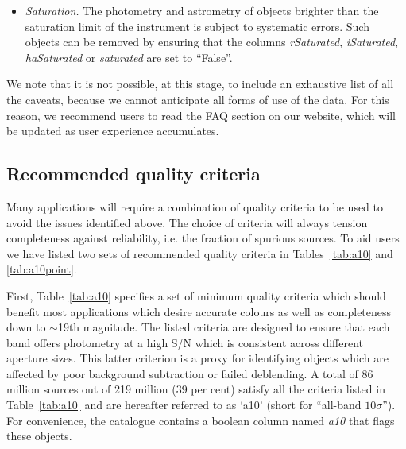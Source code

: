 \documentclass[a4paper,useAMS,usenatbib]{mn2e}
\begin{document}
{\begin{itemize}
These objects can be removed by ensuring that an
object is detected at $S/N>10$
and has photometry which is consistent across
the different aperture sizes.
Objects detected at $S/N>10$ in all bands
are flagged in the catalogue using the \emph{a10} column.
\item \emph{Saturation.}
The photometry and astrometry of objects
brighter than the saturation limit of the instrument
is subject to systematic errors.
Such objects can be removed by ensuring that the columns
\emph{rSaturated}, \emph{iSaturated}, \emph{haSaturated}
or \emph{saturated} are set to ``False''.
\end{itemize}
We note that it is not possible, at this stage,
to include an exhaustive list of all the caveats,
because we cannot anticipate all forms of use of the data.
For this reason, we recommend users to read
the FAQ section on our website,
which will be updated as user experience accumulates.


\subsection{Recommended quality criteria}
\label{sec:qualitycriteria}

Many applications will require
a combination of quality criteria
to be used
to avoid the issues identified above.
The choice of criteria will always tension 
completeness against reliability,
i.e. the fraction of spurious sources.
To aid users we have listed two sets of
recommended quality criteria 
in Tables~\ref{tab:a10} and \ref{tab:a10point}.

First, Table~\ref{tab:a10} specifies
a set of minimum quality criteria
which should benefit most applications
which desire accurate colours
as well as completeness down to $\sim$19th magnitude.
The listed criteria are designed
to ensure that each band offers photometry
at a high S/N which is consistent
across different aperture sizes.
This latter criterion is a proxy
for identifying objects which are affected
by poor background subtraction
or failed deblending.
A total of 86 million sources out of 219 million 
(39 per cent) satisfy all the criteria listed in Table~\ref{tab:a10}
and are hereafter referred to as `a10'
(short for ``all-band $10\sigma$'').
For convenience, the catalogue contains a boolean column
named \emph{a10} that flags these objects.

}
\end{document}
